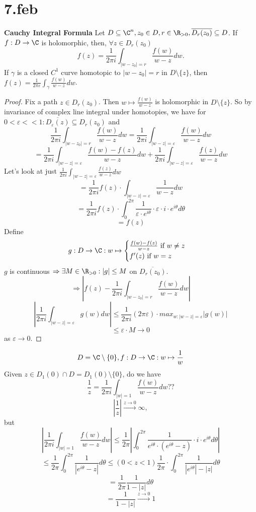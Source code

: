 \section{7.feb}
\begin{theorem}
  \textbf{Cauchy Integral Formula}
  \newline Let $D\subseteq \C^n, z_0\in D, r\in \R_{>0}, \overline{D_r(z_0)}\subseteq D$.
  \newline If $f:D\to \C$ is holomorphic, then, $\forall z\in D_r(z_0)$
    $$f(z)=\frac{1}{2\pi i} \int_{|w-z_0|=r}\frac{f(w)}{w-z}dw.$$
  If $\gamma$ is a closed $C^1$ curve homotopic to $|w-z_0|=r$ in $D\setminus \{z\}$, then $f(z)=\frac{1}{2\pi \varepsilon}\int_{\gamma}\frac{f(w)}{w-z}dw$.
\end{theorem}
\begin{proof}
  Fix a path $z\in D_r(z_0)$. Then $w\mapsto \frac{f(w)}{w-z}$ is holomorphic in $D\setminus\{z\}$. So by invariance of complex line integral under homotopies, we have for
    $0<\varepsilon<< 1: \overline{D_{\varepsilon}(z)}\subseteq D_r(z_0)$ and
    $$\frac{1}{2\pi i}\int_{|w-z_0|=r}\frac{f(w)}{w-z}dw=\frac{1}{2\pi i}\int_{|w-z|=\varepsilon}\frac{f(w)}{w-z}dw$$
    $$=\frac{1}{2\pi i}\int_{|w-z|=\varepsilon}\frac{f(w)-f(z)}{w-z}dw+\frac{1}{2\pi i}\int_{|w-z|=\varepsilon}\frac{f(z)}{w-z}dw$$
    Let's look at just $\frac{1}{2\pi i}\int_{|w-z|=\varepsilon}\frac{f(z)}{w-z}dw$
    $$=\frac{1}{2\pi i}f(z) \cdot\int_{|w-z|=\varepsilon}\frac{1}{w-z}dw$$
    $$=\frac{1}{2\pi i}f(z) \cdot \int_{0}^{2\pi }\frac{1}{\varepsilon \cdot e^{i\theta}} \cdot \varepsilon \cdot i \cdot e^{i\theta}d\theta$$
    $$=f(z)$$
    Define
    $$g:D\to\C:w\mapsto
\begin{cases}
  \frac{f(w)-f(z)}{w-z} \text{ if }w\neq z \\
  f'(z) \text{ if } w=z
\end{cases}
    $$
    $g$ is continuous $\Rightarrow \exists M\in \R_{>0}:|g|\leq M$ on $\overline{D_r(z_0)}$.
    $$\Rightarrow \left|f(z)-\frac{1}{2\pi i} \int_{|w-z_0|=r}\frac{f(w)}{w-z}dw  \right|$$
    $$\left|\frac{1}{2\pi i} \int_{|w-z|=\varepsilon}g(w)dw\right|\leq \frac{1}{2\pi i}(2\pi \varepsilon) \cdot max_{w:|w-z|=\varepsilon}|g(w)|$$
    $$\leq \varepsilon \cdot M \to 0$$
    as $\varepsilon \to 0$.
\end{proof}

$$D=\C\setminus\{0\}, f:D\to \C: w\mapsto \frac{1}{w}$$
Given $z\in D_1(0)\cap D=D_1(0)\setminus\{0\}$, do we have
  $$\frac{1}{z}= \frac{1}{2\pi i}\int_{|w|=1}\frac{f(w)}{w-z}dw??$$
  $$|\frac{1}{z}|\xrightarrow{z\to 0}\infty,$$
  but
  $$\left|\frac{1}{2\pi i}\int_{|w|=1}\frac{f(w)}{w-z}dw\right|\leq \frac{1}{2\pi } \left| \int_{0}^{2\pi}\frac{1}{e^{i\theta} \cdot (e^{i\theta}-z)} \cdot i \cdot e^{i\theta}d\theta \right|$$
  $$\leq \frac{1}{2\pi } \int_{0}^{2\pi}\frac{1}{|e^{i\theta}-z|}d\theta \leq (0<z<1) \frac{1}{2\pi } \cdot \int_{0}^{2\pi}\frac{1}{|e^{i\theta}|-|z|}d\theta$$
  $$=\frac{1}{2\pi}\frac{1}{1-|z|}d\theta$$
  $$=\frac{1}{1-|z|}\xrightarrow{z\to 0}1$$

